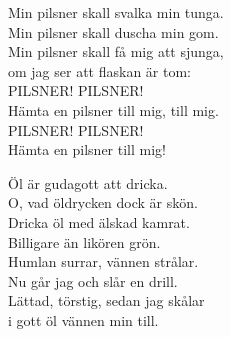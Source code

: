 \documentclass[a6paper, 10pt, twoside]{article}
\begin{document}
\begin{center}
\end{center}
\begin{lyrics}
Min pilsner skall svalka min tunga. \\
Min pilsner skall duscha min gom. \\
Min pilsner skall få mig att sjunga, \\
om jag ser att flaskan är tom: \\
\newline
PILSNER! PILSNER! \\
Hämta en pilsner till mig, till mig. \\
PILSNER! PILSNER! \\
Hämta en pilsner till mig!
\end{lyrics}
\vspace{40pt}
\begin{center}
\end{center}
\begin{lyrics}
Öl är gudagott att dricka. \\
O, vad öldrycken dock är skön. \\
Dricka öl med älskad kamrat. \\
Billigare än likören grön. \\
Humlan surrar, vännen strålar. \\
Nu går jag och slår en drill. \\
Lättad, törstig, sedan jag skålar \\
i gott öl vännen min till. 
\end{lyrics}
\end{document}
